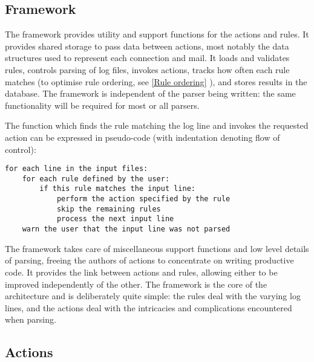 \documentclass[draft]{svmult}
\newcommand{\sectionref}[1]{%
    \textsection{}\vref*{#1}%
}
\begin{document}
\subsection{Framework}

\label{Framework}

The framework provides utility and support functions for the actions and
rules.  It provides shared storage to pass data between actions, most
notably the data structures used to represent each connection and mail.  It
loads and validates rules, controls parsing of log files, invokes actions,
tracks how often each rule matches (to optimise rule ordering, see
\sectionref{Rule ordering}), and stores results in the database.  The
framework is independent of the parser being written: the same
functionality will be required for most or all parsers.

The function which finds the rule matching the log line and invokes the
requested action can be expressed in pseudo-code (with indentation denoting
flow of control):


\begin{verbatim}
for each line in the input files: 
    for each rule defined by the user: 
        if this rule matches the input line:
            perform the action specified by the rule
            skip the remaining rules
            process the next input line
    warn the user that the input line was not parsed
\end{verbatim}

The framework takes care of miscellaneous support functions and low level
details of parsing, freeing the authors of actions to concentrate on
writing productive code.  It provides the link between actions and rules,
allowing either to be improved independently of the other.  The framework
is the core of the architecture and is deliberately quite simple: the rules
deal with the varying log lines, and the actions deal with the intricacies
and complications encountered when parsing.

\subsection{Actions}

\label{Actions}
\end{document}
